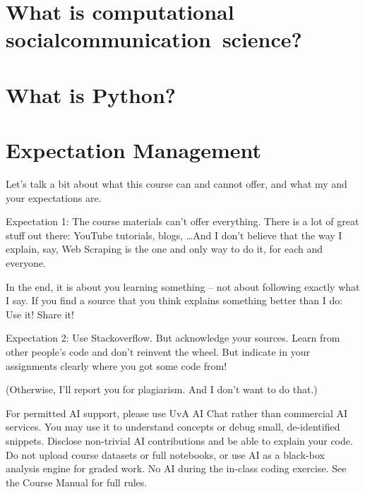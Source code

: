 \documentclass[compress]{beamer}
\begin{document}
\section[What is CSS\textbar CCS?]{What is computational \lbrack social\textbar communication\rbrack  ~science?}



\section{What is Python?}




\section{Expectation Management}


\begin{frame}[standout]
	Let's talk a bit about what this course can and cannot offer, and what my and your expectations are.
\end{frame}
 

\begin{frame}{Expectation 1: The course materials can't offer everything.}
There is a lot of great stuff out there: YouTube tutorials, blogs, \ldots And I don't believe that the way I explain, say, Web Scraping is the one and only way to do it, for each and everyone.

In the end, it is about you learning something -- not about following exactly what I say. If you find a source that you think explains something better than I do: Use it! Share it!
\end{frame}


\begin{frame}{Expectation 2: Use Stackoverflow. But acknowledge your sources.}
Learn from other people's code and don't reinvent the wheel. But indicate in your assignments clearly where you got some code from! 

(Otherwise, I'll report you for plagiarism. And I don't want to do that.)
\end{frame}


\begin{frame}[standout]
For permitted AI support, please use UvA AI Chat rather than commercial AI services. You may use it to understand concepts or debug small, de-identified snippets. Disclose non-trivial AI contributions and be able to explain your code. Do not upload course datasets or full notebooks, or use AI as a black-box analysis engine for graded work. No AI during the in-class coding exercise. See the Course Manual for full rules.
\end{frame}
\end{document}
